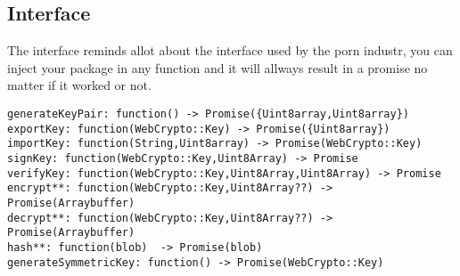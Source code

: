 \subsection{Interface}
The interface reminds allot about the interface used by the porn industr, you can inject your package in any function and it will allways result in a promise no matter if it worked or not.
\begin{Code}
\begin{lstlisting}[caption={Common database operations}, label={lst:api}]
generateKeyPair: function() -> Promise({Uint8array,Uint8array})
exportKey: function(WebCrypto::Key) -> Promise({Uint8array})
importKey: function(String,Uint8array) -> Promise(WebCrypto::Key)
signKey: function(WebCrypto::Key,Uint8Array) -> Promise
verifyKey: function(WebCrypto::Key,Uint8Array,Uint8Array) -> Promise
encrypt**: function(WebCrypto::Key,Uint8Array??) -> Promise(Arraybuffer)
decrypt**: function(WebCrypto::Key,Uint8Array??) -> Promise(Arraybuffer)
hash**: function(blob)  -> Promise(blob)
generateSymmetricKey: function() -> Promise(WebCrypto::Key)
\end{lstlisting}
\end{Code}

